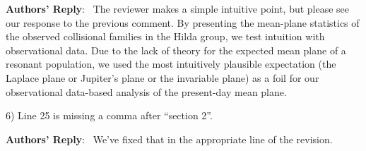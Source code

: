 \documentclass[11pt]{article}
\newcounter{reviewer}
\newcounter{point}[reviewer]
\newenvironment{reply}
   {\medskip \noindent \begin{sf}\textbf{Authors' Reply}:\  }
   {\medskip \end{sf}\medskip}
\begin{document}
\begin{reply}
The reviewer makes a simple intuitive point, but please see our response to the previous comment.
By presenting the mean-plane statistics of the observed collisional families in the Hilda group, we test intuition with observational data.
Due to the lack of theory for the expected mean plane of a resonant population, we used the most intuitively plausible expectation (the Laplace plane or Jupiter’s plane or the invariable plane) as a foil for our observational data-based analysis of the present-day mean plane.




\end{reply}

6) Line 25 is missing a comma after ``section 2''.

\begin{reply}
We've fixed that in the appropriate line of the revision.

\end{reply}
\end{document}

